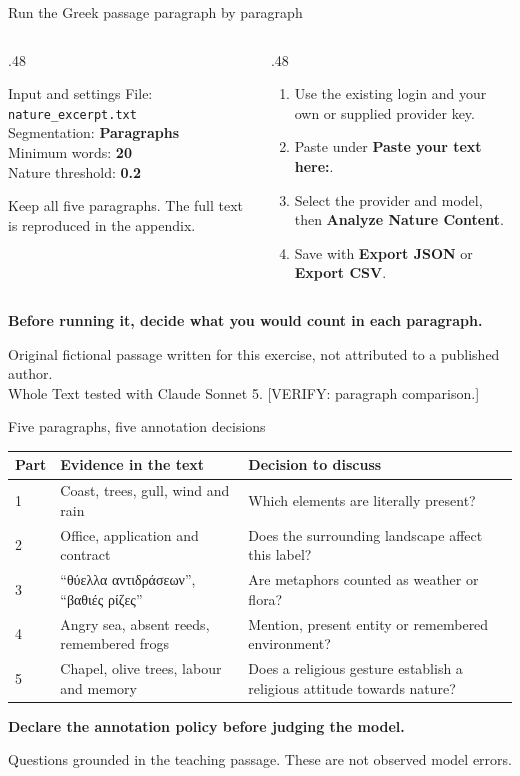 \documentclass[aspectratio=169,10pt]{beamer}
\newcommand{\key}[1]{\textcolor{aegean}{\textbf{#1}}}
\newcommand{\source}[1]{\vfill{\scriptsize\color{slate}#1\par}}
\newcommand{\question}[1]{\medskip\par\key{#1}\par}
\begin{document}
\begin{frame}{Run the Greek passage paragraph by paragraph}
  \begin{columns}[T]
    \begin{column}{.48\textwidth}
      \begin{block}{Input and settings}
        File: \texttt{nature\_excerpt.txt}\\[5pt]
        Segmentation: \key{Paragraphs}\\
        Minimum words: \key{20}\\
        Nature threshold: \key{0.2}
      \end{block}
      \small Keep all five paragraphs. The full text is reproduced in the appendix.
    \end{column}
    \begin{column}{.48\textwidth}
      \begin{enumerate}
        \item Use the existing login and your own or supplied provider key.
        \item Paste under \textbf{Paste your text here:}.
        \item Select the provider and model, then \textbf{Analyze Nature Content}.
        \item Save with \textbf{Export JSON} or \textbf{Export CSV}.
      \end{enumerate}
    \end{column}
  \end{columns}
  \question{Before running it, decide what you would count in each paragraph.}
  \source{Original fictional passage written for this exercise, not attributed to a published author.\\
  Whole Text tested with Claude Sonnet 5. [VERIFY: paragraph comparison.]}
\end{frame}

\begin{frame}{Five paragraphs, five annotation decisions}
  \small
  \begin{tabularx}{\textwidth}{@{}lXX@{}}
    \toprule
    \textbf{Part} & \textbf{Evidence in the text} & \textbf{Decision to discuss}\\
    \midrule
    1 & Coast, trees, gull, wind and rain & Which elements are literally present?\\[4pt]
    2 & Office, application and contract & Does the surrounding landscape affect this label?\\[4pt]
    3 & “θύελλα αντιδράσεων”, “βαθιές ρίζες” & Are metaphors counted as weather or flora?\\[4pt]
    4 & Angry sea, absent reeds, remembered frogs & Mention, present entity or remembered environment?\\[4pt]
    5 & Chapel, olive trees, labour and memory & Does a religious gesture establish a religious attitude towards nature?\\
    \bottomrule
  \end{tabularx}
  \question{Declare the annotation policy before judging the model.}
  \source{Questions grounded in the teaching passage. These are not observed model errors.}
\end{frame}
\end{document}
